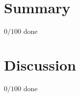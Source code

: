 \documentclass[a4paper]{article}
\begin{document}
\begin{multicols}{2}

\section{Summary}
%
$0/100$ done

\section{Discussion}

$0/100$ done


%

\printbibliography

\end{multicols}
\end{document}
